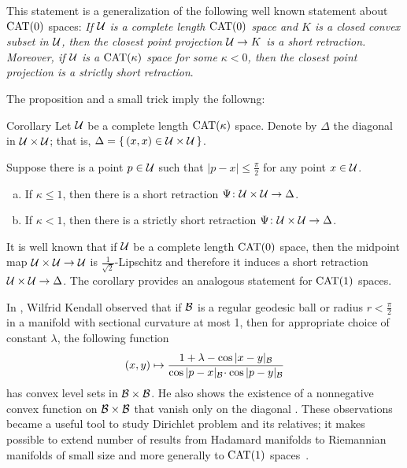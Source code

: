 \documentclass[oneside,a4paper, 12pt]{article}
\begin{document}
This statement is a generalization of the following well known statement about $\mathrm{CAT}(0)$ spaces:
\emph{If ${\mathcal{U}}$ is a complete length $\mathrm{CAT}(0)$ space and $K$ is a closed convex subset in ${\mathcal{U}}$,
then the closest point projection ${\mathcal{U}}\to K$ is a short retraction.
Moreover, if $\mathcal{U}$ is a $\mathrm{CAT}(\kappa)$ space for some $\kappa<0$, then  the closest point projection is a strictly short retraction}.

The proposition and a small trick imply the followng:

\begin{thm}{Corollary}\label{cor}
Let $\mathcal{U}$ be a complete length $\mathrm{CAT}(\kappa)$ space.
Denote by $\Delta$ the diagonal in $\mathcal{U}\times \mathcal{U}$;
that is, $\Delta=\{\,(x,x)\in \mathcal{U}\times \mathcal{U}\,\}$.

Suppose there is a point $p\in \mathcal{U}$ such that $|p-x|\le \tfrac\pi2$ for any point $x\in \mathcal{U}$.
\begin{enumerate}[(a)]
\item
If $\kappa\le 1$, then there is a short retraction $\Psi\colon\mathcal{U}\times \mathcal{U}\to \Delta$.
\item If $\kappa<1$, then there is a strictly short retraction $\Psi\colon\mathcal{U}\times \mathcal{U}\to \Delta$.
\end{enumerate}

\end{thm}

It is well known that if $\mathcal{U}$ be a complete length $\mathrm{CAT}(0)$ space, then the midpoint map $\mathcal{U}\times \mathcal{U}\to \mathcal{U}$ is $\tfrac1{\sqrt{2}}$-Lipschitz and therefore it induces a short retraction $\mathcal{U}\times \mathcal{U}\to\Delta$. 
The corollary provides an analogous statement for $\mathrm{CAT}(1)$ spaces.


In \cite[(4.1)]{kendall}, Wilfrid Kendall observed that if $\mathcal{B}$ is a regular geodesic ball or radius $r<\tfrac\pi2$ in a manifold with sectional curvature at most 1, then for appropriate choice of constant $\lambda$, the following function
\[(x,y)\mapsto 
\frac{1+\lambda-\cos|x-y|_{\spc{B}}}{\cos|p-x|_{\spc{B}}\cdot \cos|p-y|_{\spc{B}}}
\]
has convex level sets in ${\mathcal{B}}\times {\mathcal{B}}$.
He also shows the existence of a nonnegative convex function on ${\mathcal{B}}\times {\mathcal{B}}$ that vanish only on the diagonal \cite[(4.2)]{kendall}.
These observations became a useful tool to study Dirichlet problem and its relatives;
it makes possible to extend number of results from Hadamard manifolds to Riemannian manifolds of small size
and more generally to $\mathrm{CAT}(1)$ spaces~\cite{yokota,BFHMSZ,fuglede,serbinowski}. 
\end{document}
